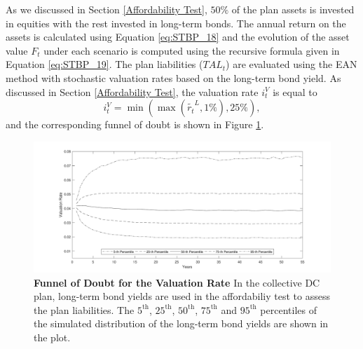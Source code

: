 \documentclass{sfuthesis}
\numberwithin{equation}{chapter}
\begin{document}
		\justify
		As we discussed in Section \ref{Affordability Test}, $50\%$ of the plan assets is invested in equities with the rest invested in long-term bonds. The annual return on the assets is calculated using Equation \eqref{eq:STBP_18} and the evolution of the asset value $F_{t}$ under each scenario is computed using the recursive formula given in Equation \eqref{eq:STBP_19}. The plan liabilities ($TAL_{t}$) are evaluated using the EAN method with stochastic valuation rates based on the long-term bond yield. As discussed in Section \ref{Affordability Test}, the valuation rate $i_{t}^V$ is equal to
		\begin{equation}
		\label{eq:VB_1}
		i_{t}^V = \min(\max(\tilde{r_{t}}^L, 1\%), 25\%),
		\end{equation}
		and the corresponding funnel of doubt is shown in Figure 
		\ref{fig:Funnel of Doubt for the Valuation Rate}. 
		\begin{figure}[H]	
			\includegraphics[width=\linewidth]{ResultPlot/DISC.pdf} 
			\caption[Funnel of Doubt for the Valuation Rate]{\textbf{Funnel of Doubt for the Valuation Rate}
				\vspace{-0.4cm}
				\newline\footnotesize\justify In the collective DC plan, long-term bond yields are used in the affordabiliy test to assess the plan liabilities. The $5^{\text{th}}$, $25^{\text{th}}$, $50^{\text{th}}$, $75^{\text{th}}$ and $95^{\text{th}}$ percentiles of the simulated distribution of the long-term bond yields are shown in the plot.}
			\label{fig:Funnel of Doubt for the Valuation Rate}
		\end{figure}
\end{document}
